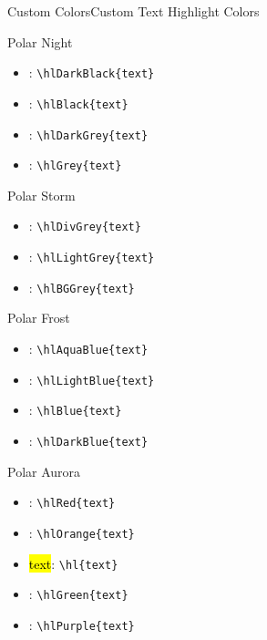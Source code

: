 \documentclass[aspectratio=169, sectionpages]{beamer}
\begin{document}
\begin{frame}[fragile,t]{Custom Colors}{Custom Text Highlight Colors}
	\begin{minipage}[t]{0.45\textwidth}
		\vspace{0pt}
		{\Large{Polar Night}}
		\begin{itemize}
			\item  {}: \verb!\hlDarkBlack{text}!
			\item  {}: \verb!\hlBlack{text}!
			\item  {}: \verb!\hlDarkGrey{text}!
			\item  {}: \verb!\hlGrey{text}!
		\end{itemize}

		{\Large{Polar Storm}}

		\begin{itemize}
			\item  {}: \verb!\hlDivGrey{text}!
			\item  {}: \verb!\hlLightGrey{text}!
			\item  {}: \verb!\hlBGGrey{text}!
		\end{itemize}
	\end{minipage}
	\hspace{0.05\textwidth}
	\begin{minipage}[t]{0.45\textwidth}
		\vspace{0pt}
		{\Large{Polar Frost}}
		\begin{itemize}
			\item  {}: \verb!\hlAquaBlue{text}!
			\item  {}: \verb!\hlLightBlue{text}!
			\item  {}: \verb!\hlBlue{text}!
			\item  {}: \verb!\hlDarkBlue{text}!
		\end{itemize}

		{\Large{Polar Aurora}}

		\begin{itemize}
			\item  {}: \verb!\hlRed{text}!
			\item  {}: \verb!\hlOrange{text}!
			\item  \hl{text}: \verb!\hl{text}!
			\item  {}: \verb!\hlGreen{text}!
			\item  {}: \verb!\hlPurple{text}!
		\end{itemize}
	\end{minipage}
\end{frame}
\end{document}
